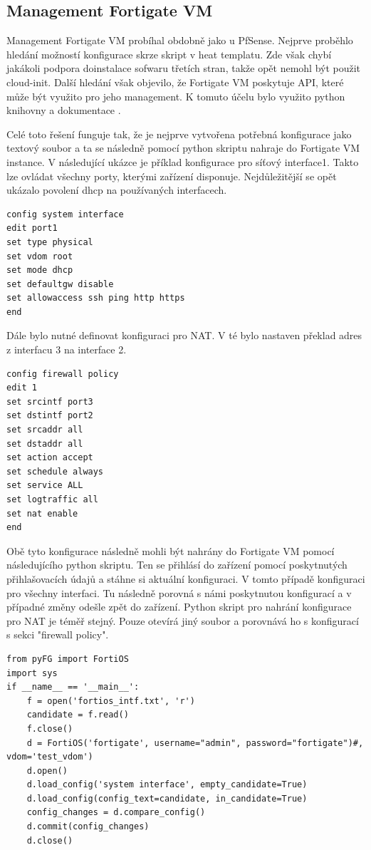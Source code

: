 \subsection{Management Fortigate VM}

Management Fortigate VM probíhal obdobně jako u PfSense. Nejprve proběhlo hledání možností konfigurace skrze skript v heat templatu. Zde však chybí jakákoli podpora doinstalace sofwaru třetích stran, takže opět nemohl být použit cloud-init. Další hledání však objevilo, že Fortigate VM poskytuje API, které může být využito pro jeho management. K tomuto účelu bylo využito python knihovny a dokumentace \cite{pyfg}.

Celé toto řešení funguje tak, že je nejprve vytvořena potřebná konfigurace jako textový soubor a ta se následně pomocí python skriptu nahraje do Fortigate VM instance. V následující ukázce je příklad konfigurace pro síťový interface1. Takto lze ovládat všechny porty, kterými zařízení disponuje. Nejdůležitější se opět ukázalo povolení dhcp na používaných interfacech. 

\begin{lstlisting}[caption=Fortigate konfigurace pro interface]
config system interface
edit port1
set type physical
set vdom root
set mode dhcp
set defaultgw disable
set allowaccess ssh ping http https
end
\end{lstlisting}

Dále bylo nutné definovat konfiguraci pro NAT. V té bylo nastaven překlad adres z interfacu 3 na interface 2. 

\begin{lstlisting}[caption=Fortigate konfigurace pro NAT]
config firewall policy
edit 1
set srcintf port3
set dstintf port2
set srcaddr all
set dstaddr all
set action accept
set schedule always
set service ALL
set logtraffic all
set nat enable
end
\end{lstlisting}

Obě tyto konfigurace následně mohli být nahrány do Fortigate VM pomocí následujícího python skriptu. Ten se přihlásí do zařízení pomocí poskytnutých přihlašovacích údajů a stáhne si aktuální konfiguraci. V tomto případě konfiguraci pro všechny interfaci. Tu následně porovná s námi poskytnutou konfigurací a v případné změny odešle zpět do zařízení. Python skript pro nahrání konfigurace pro NAT je téměř stejný. Pouze otevírá jiný soubor a porovnává ho s konfigurací s sekci "firewall policy".

\begin{lstlisting}[caption=Skript pro nahrání konfigurace interfaců]
from pyFG import FortiOS
import sys
if __name__ == '__main__':
    f = open('fortios_intf.txt', 'r')
    candidate = f.read()
    f.close()
    d = FortiOS('fortigate', username="admin", password="fortigate")#, vdom='test_vdom')
    d.open()
    d.load_config('system interface', empty_candidate=True)
    d.load_config(config_text=candidate, in_candidate=True)
    config_changes = d.compare_config()
    d.commit(config_changes)
    d.close()
\end{lstlisting}

